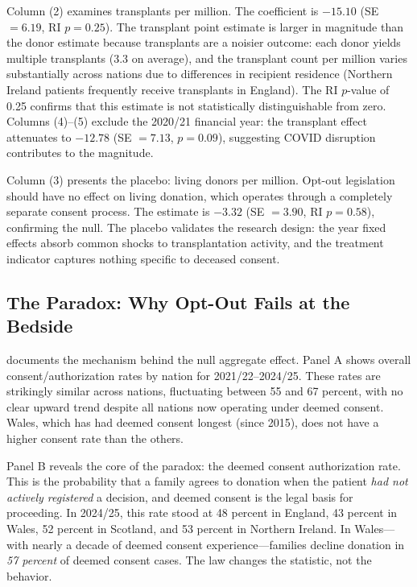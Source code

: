 \documentclass[12pt]{article}
\begin{document}
Column (2) examines transplants per million. The coefficient is $-15.10$ (SE $= 6.19$, RI $p = 0.25$). The transplant point estimate is larger in magnitude than the donor estimate because transplants are a noisier outcome: each donor yields multiple transplants (3.3 on average), and the transplant count per million varies substantially across nations due to differences in recipient residence (Northern Ireland patients frequently receive transplants in England). The RI $p$-value of 0.25 confirms that this estimate is not statistically distinguishable from zero. Columns (4)--(5) exclude the 2020/21 financial year: the transplant effect attenuates to $-12.78$ (SE $= 7.13$, $p = 0.09$), suggesting COVID disruption contributes to the magnitude.

Column (3) presents the placebo: living donors per million. Opt-out legislation should have no effect on living donation, which operates through a completely separate consent process. The estimate is $-3.32$ (SE $= 3.90$, RI $p = 0.58$), confirming the null. The placebo validates the research design: the year fixed effects absorb common shocks to transplantation activity, and the treatment indicator captures nothing specific to deceased consent.



\subsection{The Paradox: Why Opt-Out Fails at the Bedside}

 documents the mechanism behind the null aggregate effect. Panel A shows overall consent/authorization rates by nation for 2021/22--2024/25. These rates are strikingly similar across nations, fluctuating between 55 and 67 percent, with no clear upward trend despite all nations now operating under deemed consent. Wales, which has had deemed consent longest (since 2015), does not have a higher consent rate than the others.

Panel B reveals the core of the paradox: the deemed consent authorization rate. This is the probability that a family agrees to donation when the patient \textit{had not actively registered} a decision, and deemed consent is the legal basis for proceeding. In 2024/25, this rate stood at 48 percent in England, 43 percent in Wales, 52 percent in Scotland, and 53 percent in Northern Ireland. In Wales---with nearly a decade of deemed consent experience---families decline donation in \textit{57 percent} of deemed consent cases. The law changes the statistic, not the behavior.
\end{document}
